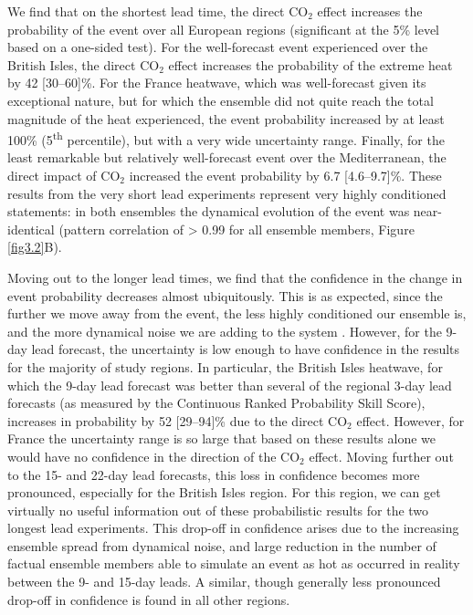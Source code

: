   We find that on the shortest lead time, the direct CO$_2$ effect increases the probability of the event over all European regions (significant at the 5\% level based on a one-sided test). For the well-forecast event experienced over the British Isles, the direct CO$_2$ effect increases the probability of the extreme heat by 42 [30--60]\%. For the France heatwave, which was well-forecast given its exceptional nature, but for which the ensemble did not quite reach the total magnitude of the heat experienced, the event probability increased by at least 100\% (5\textsuperscript{th} percentile), but with a very wide uncertainty range. Finally, for the least remarkable but relatively well-forecast event over the Mediterranean, the direct impact of CO$_2$ increased the event probability by 6.7 [4.6--9.7]\%. These results from the very short lead experiments represent very highly conditioned statements: in both ensembles the dynamical evolution of the event was near-identical (pattern correlation of > 0.99 for all ensemble members, Figure \ref{fig3.2}B).
  
  Moving out to the longer lead times, we find that the confidence in the change in event probability decreases almost ubiquitously. This is as expected, since the further we move away from the event, the less highly conditioned our ensemble is, and the more dynamical noise we are adding to the system \citep{shepherd_common_2016}. However, for the 9-day lead forecast, the uncertainty is low enough to have confidence in the results for the majority of study regions. In particular, the British Isles heatwave, for which the 9-day lead forecast was better than several of the regional 3-day lead forecasts (as measured by the Continuous Ranked Probability Skill Score), increases in probability by 52 [29--94]\% due to the direct CO$_2$ effect. However, for France the uncertainty range is so large that based on these results alone we would have no confidence in the direction of the CO$_2$ effect. Moving further out to the 15- and 22-day lead forecasts, this loss in confidence becomes more pronounced, especially for the British Isles region. For this region, we can get virtually no useful information out of these probabilistic results for the two longest lead experiments. This drop-off in confidence arises due to the increasing ensemble spread from dynamical noise, and large reduction in the number of factual ensemble members able to simulate an event as hot as occurred in reality between the 9- and 15-day leads. A similar, though generally less pronounced drop-off in confidence is found in all other regions. 
  
